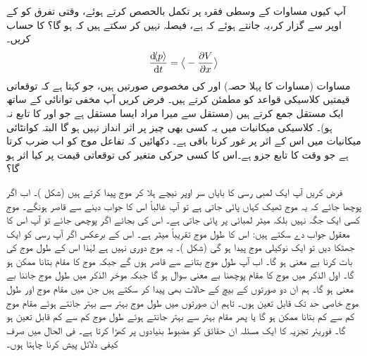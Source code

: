 آپ کیوں مساوات  کے وسطی فقرہ پر تکمل بالحصص کرتے ہوئے، وقتی تفرق کو  کے اوپر سے گزار کر،یہ جانتے ہوئے کہ  ہے، فیصلہ نہیں کر سکتے ہیں کہ  ہو گا؟
 کا حساب کریں۔
\begin{align}\label{مساوات_تفاعل_موج_مخفی_توانائی_سے_معیار_حرکت}
\frac{\dif\langle p \rangle}{\dif t}=\big\langle-\frac{\partial V}{\partial x} \big\rangle
\end{align}
مساوات  (مساوات  کا پہلا حصہ) اور   کی مخصوص صورتیں ہیں، جو کہتا ہے کہ توقعاتی قیمتیں کلاسیکی قواعد کو مطمئن کرتے ہیں۔
فرض کریں آپ مخفی توانائی کے ساتھ ایک مستقل جمع کرتے ہیں (مستقل سے میرا مراد ایسا مستقل ہے  جو  اور  کا تابع نہ ہو)۔ کلاسیکی میکانیات میں یہ کسی بھی چیز پر اثر انداز نہیں ہو گا البتہ کوانٹائی میکانیات میں اس کے اثر پر غور کرنا باقی ہے۔ دکھائیں کہ تفاعل موج کو اب  ضرب کرتا ہے جو وقت کا تابع جزو ہے۔اس کا کسی حرکی متغیر کی توقعاتی قیمت پر کیا اثر ہو گا؟ 

فرض کریں آپ ایک لمبی رسی کا  بایاں  سر اوپر نیچے  ہلا کر موج پیدا کرتے ہیں (شکل )۔ اب اگر پوچھا جائے کہ یہ موج ٹھیک  کہاں پائی جاتی ہے تو آپ غالباً اس کا جواب دینے سے قاصر ہونگے۔ موج کسی ایک جگہ نہیں بلکہ    میٹر لمبائی پر پائی جاتی ہے۔ اس کی بجائے اگر   پوچھی جائے  تو آپ اس کا معقول جواب دے سکتے ہیں:  اس کا طول موج تقریباً      میٹر ہے۔ اس کے برعکس اگر آپ رسی کو ایک جھٹکا دیں تو  ایک نوکیلی موج پیدا ہو گی
 (شکل )۔ یہ موج دوری نہیں ہے لہٰذا اس کے طول موج کی بات کرنا بے معنی ہو گا۔ اب آپ طول موج بتانے سے قاصر ہوں گے جبکہ  موج کا مقام بتانا ممکن ہو گا۔ اول الذکر  میں موج کا مقام پوچھنا بے معنی سوال ہو گا جبکہ موخر الذکر میں طول موج جاننا بے معنی  ہو گا۔ ہم ان دو صورتوں کے بیچ کے حالات بھی پیدا کر سکتے ہیں  جن میں  مقام موج   اور  طول موج خاصی حد تک قابل تعین ہوں۔ تاہم ان صورتوں میں طول موج بہتر سے بہتر جانتے ہوئے مقام موج کم سے کم بتانا ممکن ہو گا یا پھر مقام بہتر سے بہتر جانتے ہوئے طول موج کم سے کم قابل تعین   ہو گا۔ فوریئر تجزیہ کا ایک مسئلہ ان حقائق کو مضبوط بنیادوں پر کھڑا کرتا ہے۔ فی الحال میں صرف کیفی دلائل پیش کرنا چاہتا ہوں۔


